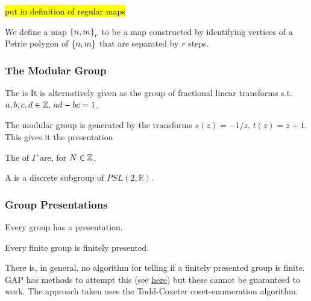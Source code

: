 \documentclass{article}
\begin{document}
\hl{put in definition of regular maps}

\begin{definition}
	We define a map $\left\{ n,m \right\}_r$ to be a map constructed by identifying vertices of a Petrie polygon of $\left\{ n,m \right\}$ that are separated by $r$ steps. 
\end{definition}

\subsubsection{The Modular Group}

\begin{definition}
	The  is 
It is alternatively given as the group of fractional linear transforms 
s.t. $a,b,c,d \in \mathbb{Z}, \, ad-bc=1$. 
\end{definition}

\begin{lemma}
	The modular group is generated by the transforms $s(z) = -1/z, \, t(z) = z+1$. This gives it the presentation 
\end{lemma}

\begin{definition}
	The  of $\Gamma$ are, for $N \in \mathbb{Z}$, 
\end{definition} 

\begin{definition}
	A  is a discrete subgroup of $PSL(2, \mathbb{R})$. 
\end{definition}

\subsubsection{Group Presentations}

\begin{theorem}
	Every group has a presentation.
\end{theorem}
\begin{corollary}
	Every finite group is finitely presented. 
\end{corollary}

\begin{remark}
	There is, in general, no algorithm for telling if a finitely presented group is finite. GAP has methods to attempt this (see \href{https://www.gap-system.org/Manuals/doc/ref/chap47.html#X86C43E3B81ED25DC}{here}) but these cannot be guaranteed to work. The approach taken uses the Todd-Coxeter coset-enumeration algorithm. 
\end{remark}
\end{document}
